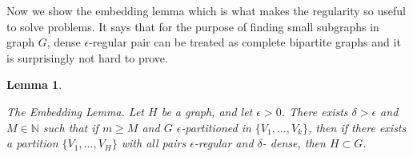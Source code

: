 \documentclass[12pt,twoside,a4paper]{book}
\numberwithin{equation}{section}
\newtheorem{lemma}     	[theorem] {Lemma}
\newtheorem{definition}	[theorem] {Definition}
\theoremstyle{remark}
\begin{document}
Now we show the embedding lemma which is what makes the regularity so useful to solve problems. It says that for the purpose of finding small subgraphs in graph $G$, dense $\epsilon$-regular pair can be treated as complete bipartite graphs and it is surprisingly not hard to prove.


\begin{lemma}\label{lemma:embeddinglemma}


The Embedding Lemma. Let $H$ be a graph, and let $\epsilon >0$. There exists $\delta >\epsilon$ and $M \in \mathbb{N}$ such that if $m \geq M$ and $G$ $\epsilon$-partitioned in $\{V_1, ..., V_k\}$, then if there exists a partition $\{V_1, ..., V_H\}$ with all pairs $\epsilon$-regular and $\delta$- dense, then $H \subset G$. 
\end{lemma} 
\end{document}
